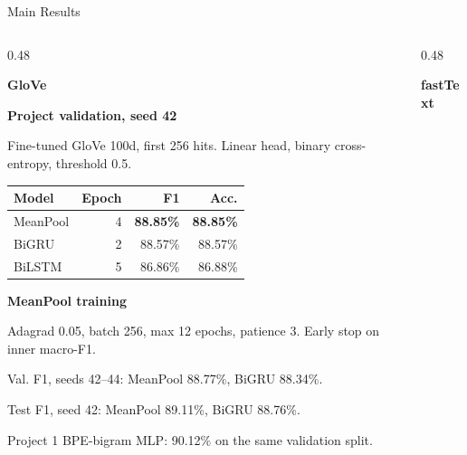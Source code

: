 \begin{frame}[t]{Main Results}
\begin{columns}[T,onlytextwidth]
\begin{column}{0.48\textwidth}
\raggedright\footnotesize
\textbf{GloVe}\par\smallskip
\textbf{Project validation, seed 42}\par
Fine-tuned GloVe 100d, first 256 hits. Linear head, binary cross-entropy, threshold 0.5.

\smallskip
{\scriptsize
\setlength{\tabcolsep}{3pt}
\begin{tabular*}{\linewidth}{@{\extracolsep{\fill}}lrrr@{}}
\hline
Model & Epoch & F1 & Acc. \\
\hline
MeanPool & 4 & \textbf{88.85\%} & \textbf{88.85\%} \\
BiGRU & 2 & 88.57\% & 88.57\% \\
BiLSTM & 5 & 86.86\% & 86.88\% \\
\hline
\end{tabular*}\par}

\smallskip
\textbf{MeanPool training}\par
Adagrad 0.05, batch 256, max 12 epochs, patience 3. Early stop on inner macro-F1.

\smallskip
{\scriptsize
Val. F1, seeds 42--44: MeanPool 88.77\%, BiGRU 88.34\%.\par
Test F1, seed 42: MeanPool 89.11\%, BiGRU 88.76\%.\par
Project 1 BPE-bigram MLP: 90.12\% on the same validation split.\par}
\end{column}
\begin{column}{0.48\textwidth}
\raggedright\footnotesize\textbf{fastText}\par
\end{column}
\end{columns}
\end{frame}

